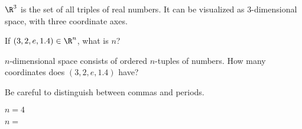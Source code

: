 \documentclass{ximera}
\begin{document}


\begin{example}
	$\R^3$ is the set of all triples of real numbers.  It can be visualized as $3$-dimensional space, with three coordinate axes. 
	
\end{example}


\begin{question}
  If $(3,2,e,1.4) \in \R^n$, what is $n$?
  \begin{solution}
    \begin{hint}
      $n$-dimensional space consists of ordered $n$-tuples of numbers.  How many coordinates does $(3,2,e,1.4)$ have?
    \end{hint}
    \begin{hint}
      \begin{warning}
        Be careful to distinguish between commas and periods.
      \end{warning}
    \end{hint}
    \begin{hint}
    	$n=4$
    \end{hint}
    $n = $ 
  \end{solution}
\end{question}
\end{document}
